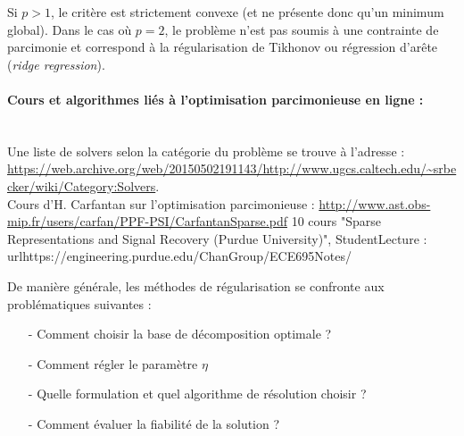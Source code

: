 Si $p>1$, le critère est strictement convexe (et ne présente donc qu'un minimum global). Dans le cas où $p=2$, le problème n'est pas soumis à une contrainte de parcimonie et correspond à la régularisation de Tikhonov ou régression d'arête (\textit{ridge regression}).


\paragraph{Cours et algorithmes liés à l'optimisation parcimonieuse en ligne :}~\\
Une liste de solvers selon la catégorie du problème se trouve à l'adresse : \url{https://web.archive.org/web/20150502191143/http://www.ugcs.caltech.edu/~srbecker/wiki/Category:Solvers}.\\
Cours d'H. Carfantan sur l'optimisation parcimonieuse : \url{http://www.ast.obs-mip.fr/users/carfan/PPF-PSI/CarfantanSparse.pdf}
10 cours  "Sparse Representations and Signal Recovery (Purdue University)", StudentLecture : url{https://engineering.purdue.edu/ChanGroup/ECE695Notes/}



De manière générale, les méthodes de régularisation se confronte aux problématiques suivantes : 
\begin{itemize}
	\item[-] Comment choisir la base de décomposition optimale ?
	\item[-] Comment régler le paramètre $\eta$
	\item[-] Quelle formulation et quel algorithme de résolution choisir ?
	\item[-] Comment évaluer la fiabilité de la solution ?
\end{itemize}







